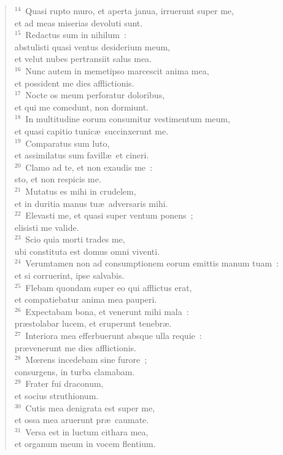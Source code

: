 \begin{flushleft}
\begin{verse}
${}^{14}$~Quasi rupto muro, et aperta janua, irruerunt super me,\\ et ad meas miserias devoluti sunt.\\
${}^{15}$~Redactus sum in nihilum~:\\ abstulisti quasi ventus desiderium meum,\\ et velut nubes pertransiit salus mea.\\
${}^{16}$~Nunc autem in memetipso marcescit anima mea,\\ et possident me dies afflictionis.\\
${}^{17}$~Nocte os meum perforatur doloribus,\\ et qui me comedunt, non dormiunt.\\
${}^{18}$~In multitudine eorum consumitur vestimentum meum,\\ et quasi capitio tunic\ae\ succinxerunt me.\\
${}^{19}$~Comparatus sum luto,\\ et assimilatus sum favill\ae\ et cineri.\\
${}^{20}$~Clamo ad te, et non exaudis me~:\\ sto, et non respicis me.\\
${}^{21}$~Mutatus es mihi in crudelem,\\ et in duritia manus tu\ae\ adversaris mihi.\\
${}^{22}$~Elevasti me, et quasi super ventum ponens~;\\ elisisti me valide.\\
${}^{23}$~Scio quia morti trades me,\\ ubi constituta est domus omni viventi.\\
${}^{24}$~Verumtamen non ad consumptionem eorum emittis manum tuam~:\\ et si corruerint, ipse salvabis.\\
${}^{25}$~Flebam quondam super eo qui afflictus erat,\\ et compatiebatur anima mea pauperi.\\
${}^{26}$~Expectabam bona, et venerunt mihi mala~:\\ pr\ae stolabar lucem, et eruperunt tenebr\ae .\\
${}^{27}$~Interiora mea efferbuerunt absque ulla requie~:\\ pr\ae venerunt me dies afflictionis.\\
${}^{28}$~Mœrens incedebam sine furore~;\\ consurgens, in turba clamabam.\\
${}^{29}$~Frater fui draconum,\\ et socius struthionum.\\
${}^{30}$~Cutis mea denigrata est super me,\\ et ossa mea aruerunt pr\ae\ caumate.\\
${}^{31}$~Versa est in luctum cithara mea,\\ et organum meum in vocem flentium.\end{verse}\end{flushleft}


